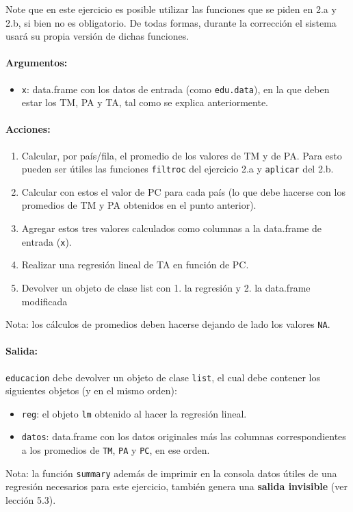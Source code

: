 \documentclass[]{article}
\begin{document}
Note que en este ejercicio es posible utilizar las funciones que se
piden en 2.a y 2.b, si bien no es obligatorio. De todas formas, durante
la corrección el sistema usará su propia versión de dichas funciones.

\paragraph{Argumentos:}

\begin{itemize}
\item
  \texttt{x}: data.frame con los datos de entrada (como
  \texttt{edu.data}), en la que deben estar los TM, PA y TA, tal como se
  explica anteriormente.
\end{itemize}
\paragraph{Acciones:}

\begin{enumerate}[1.]
\item
  Calcular, por país/fila, el promedio de los valores de TM y de PA.
  Para esto pueden ser útiles las funciones \texttt{filtroc} del
  ejercicio 2.a y \texttt{aplicar} del 2.b.
\item
  Calcular con estos el valor de PC para cada país (lo que debe hacerse
  con los promedios de TM y PA obtenidos en el punto anterior).
\item
  Agregar estos tres valores calculados como columnas a la data.frame de
  entrada (\texttt{x}).
\item
  Realizar una regresión lineal de TA en función de PC.
\item
  Devolver un objeto de clase list con 1. la regresión y 2. la
  data.frame modificada
\end{enumerate}
Nota: los cálculos de promedios deben hacerse dejando de lado los
valores \texttt{NA}.

\paragraph{Salida:}

\texttt{educacion} debe devolver un objeto de clase \texttt{list}, el
cual debe contener los siguientes objetos (y en el mismo orden):

\begin{itemize}
\item
  \texttt{reg}: el objeto \texttt{lm} obtenido al hacer la regresión
  lineal.
\item
  \texttt{datos}: data.frame con los datos originales más las columnas
  correspondientes a los promedios de \texttt{TM}, \texttt{PA} y
  \texttt{PC}, en ese orden.
\end{itemize}
Nota: la función \texttt{summary} además de imprimir en la consola datos
útiles de una regresión necesarios para este ejercicio, también genera
una \textbf{salida invisible} (ver lección 5.3).
\end{document}
